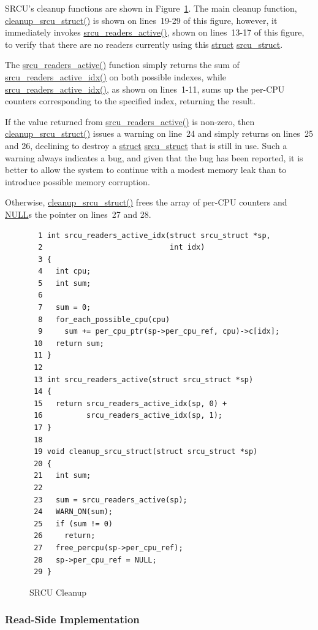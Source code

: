 SRCU's cleanup functions are shown in
Figure~\ref{fig:app:rcuimpl:SRCU Cleanup}.
The main cleanup function, \url{cleanup_srcu_struct()} is shown
on lines~19-29 of this figure, however, it immediately invokes
\url{srcu_readers_active()}, shown on lines~13-17 of this figure,
to verify that there are no readers currently using this
\url{struct} \url{srcu_struct}.

The \url{srcu_readers_active()} function simply returns the sum of
\url{srcu_readers_active_idx()} on both possible indexes,
while \url{srcu_readers_active_idx()}, as shown on lines~1-11,
sums up the per-CPU counters corresponding to the specified index,
returning the result.

If the value returned from \url{srcu_readers_active()} is non-zero,
then \url{cleanup_srcu_struct()} issues a warning on line~24 and
simply returns on lines~25 and 26, declining to destroy a
\url{struct} \url{srcu_struct} that is still in use.
Such a warning always indicates a bug, and given that the bug
has been reported, it is better to allow the system to continue
with a modest memory leak than to introduce possible memory corruption.

Otherwise, \url{cleanup_srcu_struct()} frees the array of per-CPU
counters and \url{NULL}s the pointer on lines~27 and 28.

\begin{figure}[htbp]
{ \scriptsize
\begin{verbatim}
  1 int srcu_readers_active_idx(struct srcu_struct *sp,
  2                             int idx)
  3 {
  4   int cpu;
  5   int sum;
  6 
  7   sum = 0;
  8   for_each_possible_cpu(cpu)
  9     sum += per_cpu_ptr(sp->per_cpu_ref, cpu)->c[idx];
 10   return sum;
 11 }
 12 
 13 int srcu_readers_active(struct srcu_struct *sp)
 14 {
 15   return srcu_readers_active_idx(sp, 0) +
 16          srcu_readers_active_idx(sp, 1);
 17 }
 18 
 19 void cleanup_srcu_struct(struct srcu_struct *sp)
 20 {
 21   int sum;
 22 
 23   sum = srcu_readers_active(sp);
 24   WARN_ON(sum);
 25   if (sum != 0)
 26     return;
 27   free_percpu(sp->per_cpu_ref);
 28   sp->per_cpu_ref = NULL;
 29 }
\end{verbatim}
}
\caption{SRCU Cleanup}
\label{fig:app:rcuimpl:SRCU Cleanup}
\end{figure}

\subsubsection{Read-Side Implementation}
\label{sec:app:rcuimpl:Read-Side Implementation}

